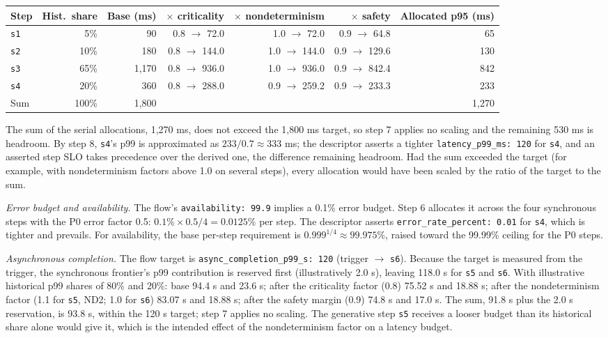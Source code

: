 \documentclass[11pt]{article}
\newcommand{\code}[1]{\texttt{#1}}
\begin{document}
\begin{center}
\footnotesize
\begin{tabular}{@{}l r r r r r r@{}}
\toprule
\textbf{Step} & \textbf{Hist.\ share} & \textbf{Base (ms)} & \(\times\) \textbf{criticality} & \(\times\) \textbf{nondeterminism} & \(\times\) \textbf{safety} & \textbf{Allocated p95 (ms)} \\
\midrule
\code{s1} & 5\% & 90 & 0.8 \(\rightarrow\) 72.0 & 1.0 \(\rightarrow\) 72.0 & 0.9 \(\rightarrow\) 64.8 & 65 \\
\code{s2} & 10\% & 180 & 0.8 \(\rightarrow\) 144.0 & 1.0 \(\rightarrow\) 144.0 & 0.9 \(\rightarrow\) 129.6 & 130 \\
\code{s3} & 65\% & 1,170 & 0.8 \(\rightarrow\) 936.0 & 1.0 \(\rightarrow\) 936.0 & 0.9 \(\rightarrow\) 842.4 & 842 \\
\code{s4} & 20\% & 360 & 0.8 \(\rightarrow\) 288.0 & 0.9 \(\rightarrow\) 259.2 & 0.9 \(\rightarrow\) 233.3 & 233 \\
\midrule
Sum & 100\% & 1,800 & & & & 1,270 \\
\bottomrule
\end{tabular}
\end{center}

The sum of the serial allocations, 1,270 ms, does not exceed the 1,800 ms target, so step 7 applies no scaling and the remaining 530 ms is headroom. By step 8, \code{s4}'s p99 is approximated as \(233 / 0.7 \approx 333\) ms; the descriptor asserts a tighter \code{latency\_p99\_ms: 120} for \code{s4}, and an asserted step SLO takes precedence over the derived one, the difference remaining headroom. Had the sum exceeded the target (for example, with nondeterminism factors above 1.0 on several steps), every allocation would have been scaled by the ratio of the target to the sum.

\emph{Error budget and availability.} The flow's \code{availability: 99.9} implies a 0.1\% error budget. Step 6 allocates it across the four synchronous steps with the P0 error factor 0.5: \(0.1\% \times 0.5 / 4 = 0.0125\%\) per step. The descriptor asserts \code{error\_rate\_percent: 0.01} for \code{s4}, which is tighter and prevails. For availability, the base per-step requirement is \(0.999^{1/4} \approx 99.975\%\), raised toward the 99.99\% ceiling for the P0 steps.

\emph{Asynchronous completion.} The flow target is \code{async\_completion\_p99\_s: 120} (trigger \(\rightarrow\) \code{s6}). Because the target is measured from the trigger, the synchronous frontier's p99 contribution is reserved first (illustratively 2.0 s), leaving 118.0 s for \code{s5} and \code{s6}. With illustrative historical p99 shares of 80\% and 20\%: base 94.4 s and 23.6 s; after the criticality factor (0.8) 75.52 s and 18.88 s; after the nondeterminism factor (1.1 for \code{s5}, ND2; 1.0 for \code{s6}) 83.07 s and 18.88 s; after the safety margin (0.9) 74.8 s and 17.0 s. The sum, 91.8 s plus the 2.0 s reservation, is 93.8 s, within the 120 s target; step 7 applies no scaling. The generative step \code{s5} receives a looser budget than its historical share alone would give it, which is the intended effect of the nondeterminism factor on a latency budget.
\end{document}
